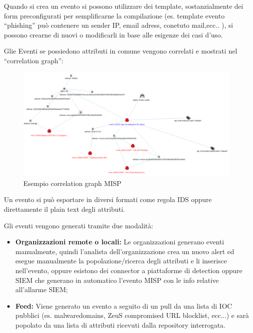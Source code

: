 Quando si crea un evento si possono utilizzare dei template, sostanzialmente dei form preconfigurati per semplificarne la compilazione (es. template evento “phishing” può contenere un sender IP, email adress, conetuto mail,ecc.. ), si possono crearne di nuovi o modificarli in base alle esigenze dei casi d’uso.\par
Glie Eventi se possiedono attributi in comune vengono correlati e mostrati nel “correlation graph”:

\begin{figure}[h]
    \begin{center}
        \includegraphics[width=0.98\columnwidth]{images/4_caso_d'uso_img/corrMISP.png}
    \end{center}
    \caption{Esempio correlation graph MISP}
    \label{fig:Esempio correlation graph MISP}
\end{figure}  


Un evento si può esportare in diversi formati come regola IDS oppure direttamente il plain text degli attributi.\par
Gli eventi vengono generati tramite due modalità:

\begin{itemize}
    \item\textbf{Organizzazioni remote o locali:} Le organizzazioni generano eventi manualmente, quindi l’analista dell’organizzazione crea un nuovo alert ed esegue manualmente la popolazione/ricerca degli attributi e li inserisce nell’evento, oppure esistono dei connector a piattaforme di detection oppure SIEM che generano in automatico l’evento MISP con le info relative all’allarme SIEM;
    \item\textbf{Feed:} Viene generato un evento a seguito di un pull da una lista di IOC pubblici (es. malwaredomains, ZeuS compromised URL blocklist, ecc...) e sarà popolato da una lista di attributi ricevuti dalla repository interrogata.
\end{itemize}

